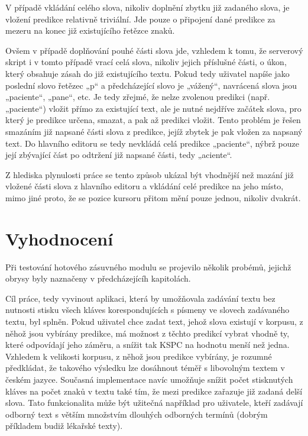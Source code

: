 \documentclass[a4paper,11pt]{article}
\begin{document}
V případě vkládání celého slova, nikoliv doplnění zbytku již zadaného slova, je vložení predikce relativně triviální. Jde pouze o připojení dané predikce za mezeru na konec již existujícího řetězce znaků. 

Ovšem v případě doplňování pouhé části slova jde, vzhledem k tomu, že serverový skript i v tomto případě vrací celá slova, nikoliv jejich příslušné části, o úkon, který obsahuje zásah do již existujícího textu. Pokud tedy uživatel napíše jako poslední slovo řetězec „p“ a předcházející slovo je „vážený“, navrácená slova jsou „paciente“, „pane“, etc. Je tedy zřejmé, že nelze zvolenou predikci (např. „paciente“) vložit přímo za existující text, ale je nutné nejdříve začátek slova, pro který je predikce určena, smazat, a pak až predikci vložit. Tento problém je řešen smazáním již napsané části slova z predikce, jejíž zbytek je pak vložen za napsaný text. Do hlavního editoru se tedy nevkládá celá predikce „paciente“, nýbrž pouze její zbývající část po odtržení již napsané části, tedy „aciente“.

Z hlediska plynulosti práce se tento způsob ukázal být vhodnější než mazání již vložené části slova z hlavního editoru a vkládání celé predikce na jeho místo, mimo jiné proto, že se pozice kursoru přitom mění pouze jednou, nikoliv dvakrát.

\section{Vyhodnocení}

Při testování hotového zásuvného modulu se projevilo několik probémů, jejichž obrysy byly naznačeny v předcházejícíh kapitolách. 


Cíl práce, tedy vyvinout aplikaci, která by umožňovala zadávání textu bez nutnosti stisku všech kláves korespondujících s písmeny ve slovech zadávaného textu, byl splněn. Pokud uživatel chce zadat text, jehož slova existují v korpusu, z něhož jsou vybírány predikce, má možnost z těchto predikcí vybrat vhodně ty, které odpovídají jeho záměru, a snížit tak KSPC na hodnotu menší než jedna. Vzhledem k velikosti korpusu, z něhož jsou predikce vybírány, je rozumné předkládat, že takového výsledku lze dosáhnout téměř s libovolným textem v českém jazyce. Současná implementace navíc umožňuje snížit počet stisknutých kláves na počet znaků v textu také tím, že mezi predikce zařazuje již zadaná delší slova. Tato funkcionalita může být užitečná například pro uživatele, kteří zadávají odborný text s větším množstvím dlouhých odborných termínů (dobrým příkladem budiž lékařské texty).
\end{document}
